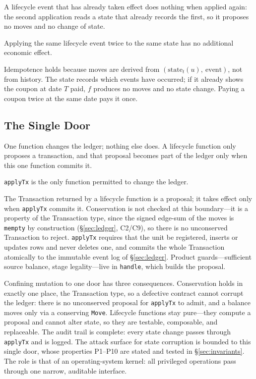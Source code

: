 A lifecycle event that has already taken effect does nothing when applied again: the second application reads a state that already records the first, so it proposes no moves and no change of state.

\begin{principle}[Idempotence]
\label{prin:idempotence}
Applying the same lifecycle event twice to the same state has no additional economic effect.
\end{principle}

Idempotence holds because moves are derived from $(\text{state}_t(u),\ \text{event})$, not from history. The state records which events have occurred; if it already shows the coupon at date $T$ paid, $f$ produces no moves and no state change. Paying a coupon twice at the same date pays it once.



\subsection{The Single Door}

One function changes the ledger; nothing else does. A lifecycle function only proposes a transaction, and that proposal becomes part of the ledger only when this one function commits it.

\begin{principle}
\label{prin:executor}
\texttt{applyTx} is the only function permitted to change the ledger.
\end{principle}

The Transaction returned by a lifecycle function is a proposal; it takes effect only when \texttt{applyTx} commits it. Conservation is not checked at this boundary---it is a property of the Transaction type, since the signed edge-sum of the moves is \texttt{mempty} by construction (\S\ref{sec:ledger}, C2/C9), so there is no unconserved Transaction to reject. \texttt{applyTx} requires that the unit be registered, inserts or updates rows and never deletes one, and commits the whole Transaction atomically to the immutable event log of \S\ref{sec:ledger}. Product guards---sufficient source balance, stage legality---live in \texttt{handle}, which builds the proposal.

Confining mutation to one door has three consequences. Conservation holds in exactly one place, the Transaction type, so a defective contract cannot corrupt the ledger: there is no unconserved proposal for \texttt{applyTx} to admit, and a balance moves only via a conserving \texttt{Move}. Lifecycle functions stay pure---they compute a proposal and cannot alter state, so they are testable, composable, and replaceable. The audit trail is complete: every state change passes through \texttt{applyTx} and is logged. The attack surface for state corruption is bounded to this single door, whose properties P1--P10 are stated and tested in \S\ref{sec:invariants}. The role is that of an operating-system kernel: all privileged operations pass through one narrow, auditable interface.

